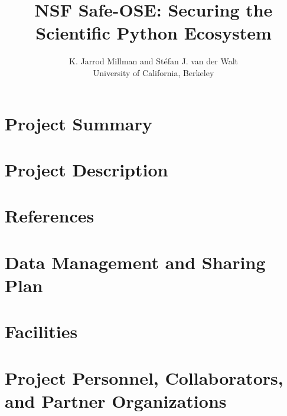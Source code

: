 \documentclass[titlepage,12pt]{amsart}
\title{NSF Safe-OSE: Securing the Scientific Python Ecosystem}
\author{ K. Jarrod Millman and Stéfan J. van der Walt\\ University of California, Berkeley}
\theoremstyle{definition}
\numberwithin{equation}{section}
\begin{document}
%
\maketitle
%
\part{Project Summary}


\newpage

\part{Project Description}


\newpage
\part{References}
\printbibliography[heading=none]

\newpage
\part{Data Management and Sharing Plan}


\newpage
\part{Facilities}


\newpage
\part{Project Personnel, Collaborators, and Partner Organizations}

\end{document}
